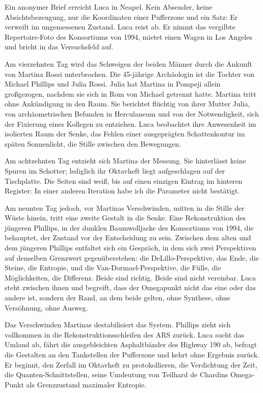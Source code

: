 \documentclass[
  ngerman,
]{article}
\begin{document}
Ein anonymer Brief erreicht Luca in Neapel. Kein Absender, keine
Absichtsbezeugung, nur die Koordinaten einer Pufferzone und ein Satz: Er
verweilt im ungemessenen Zustand. Luca reist ab. Er nimmt das vergilbte
Repertoire-Foto des Konsortiums von 1994, mietet einen Wagen in Los
Angeles und bricht in das Versuchsfeld auf.

Am vierzehnten Tag wird das Schweigen der beiden Männer durch die
Ankunft von Martina Rossi unterbrochen. Die 45-jährige Archäologin ist
die Tochter von Michael Phillips und Julia Rossi. Julia hat Martina in
Pompeji allein großgezogen, nachdem sie sich in Rom von Michael getrennt
hatte. Martina tritt ohne Ankündigung in den Raum. Sie berichtet
flüchtig von ihrer Mutter Julia, von archäometrischen Befunden in
Herculaneum und von der Notwendigkeit, sich der Fixierung eines Kollegen
zu entziehen. Luca beobachtet ihre Anwesenheit im isolierten Raum der
Senke, das Fehlen einer ausgeprägten Schattenkontur im späten
Sonnenlicht, die Stille zwischen den Bewegungen.

Am achtzehnten Tag entzieht sich Martina der Messung. Sie hinterlässt
keine Spuren im Schotter; lediglich ihr Oktavheft liegt aufgeschlagen
auf der Tischplatte. Die Seiten sind weiß, bis auf einen einzigen
Eintrag im hinteren Register: In einer anderen Iteration habe ich die
Parameter nicht bestätigt.

Am neunten Tag jedoch, vor Martinas Verschwinden, mitten in die Stille
der Wüste hinein, tritt eine zweite Gestalt in die Senke. Eine
Rekonstruktion des jüngeren Phillips, in der dunklen Baumwolljacke des
Konsortiums von 1994, die behauptet, der Zustand vor der Entscheidung zu
sein. Zwischen dem alten und dem jüngeren Phillips entfaltet sich ein
Gespräch, in dem sich zwei Perspektiven auf denselben Grenzwert
gegenüberstehen: die DeLillo-Perspektive, das Ende, die Steine, die
Entropie, und die Van-Dormael-Perspektive, die Fülle, die Möglichkeiten,
die Differenz. Beide sind richtig. Beide sind nicht vereinbar. Luca
steht zwischen ihnen und begreift, dass der Omegapunkt nicht das eine
oder das andere ist, sondern der Rand, an dem beide gelten, ohne
Synthese, ohne Versöhnung, ohne Ausweg.

Das Verschwinden Martinas destabilisiert das System. Phillips zieht sich
vollkommen in die Rekonstruktionsschleifen des ARS zurück. Luca sucht
das Umland ab, fährt die ausgebleichten Asphaltbänder des Highway 190
ab, befragt die Gestalten an den Tankstellen der Pufferzone und kehrt
ohne Ergebnis zurück. Er beginnt, den Zerfall im Oktavheft zu
protokollieren, die Verdichtung der Zeit, die Quanten-Schnittstellen,
seine Umdeutung von Teilhard de Chardins Omega-Punkt als Grenzzustand
maximaler Entropie.
\end{document}
